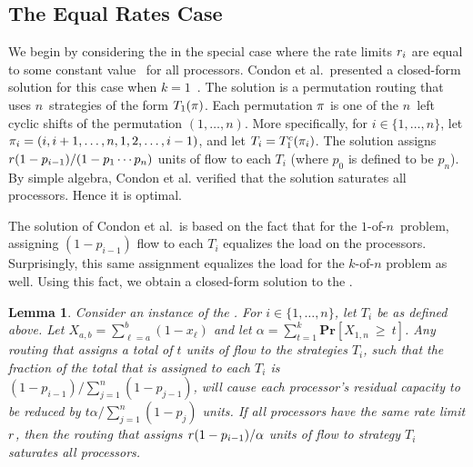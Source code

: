 \documentclass{article}
\newcounter{thmcount}
\newcounter{ass}
\newtheorem{lem}[thmcount]{Lemma}
\newcommand{\ens}[1]{\ensuremath{#1}}					\newcommand{\card}[1]{\ens{|#1|}}							\newcommand{\dotlist}[2]{\ens{#1,\ldots,#2}}
\newcommand{\anitem}{\ens{x}}
\newcommand{\valn}{\ens{n}}
\newcommand{\valk}{\ens{k}}
\newcommand{\kofn}{\valk-of-\valn}
\newcommand{\oneofn}{$1$-of-\valn}
\newcommand{\processor}{processor}
\newcommand{\retval}[1]{\ens{\anitem_{#1}}}					\newcommand{\pr}[1]{\ens{p_{#1}}}									\newcommand{\qr}[1]{\ens{q_{#1}}}									\newcommand{\op}[1]{\ens{O_{#1}}}									\newcommand{\megaop}[1]{\ens{E_{#1}}}
\newcommand{\probgen}[1]{\ens{\mathbf{Pr}\left[#1\right]}}
\newcommand{\hitsum}[2]{\ens{X_{#1,#2}}}					\newcommand{\probeq}[3]{\probgen{\hitsum{#1}{#2}~=~#3}}
\newcommand{\probge}[3]{\probgen{\hitsum{#1}{#2}~\geq~#3}}
\begin{document}
\subsection{The Equal Rates Case}

We begin by considering the \cmt{} in the special case where the rate limits $\rate i$ are equal to some constant
value \commonr\ for all {\processor}s.
Condon et al.~presented a closed-form solution for this case 
when $\valk = 1$~\cite{journals/talg/CondonDHW09}.  
The solution is a permutation routing that uses \valn\ strategies of the form $T_1(\perm)$.
Each permutation $\perm$ is one of the \valn\ 
left cyclic shifts of the permutation $(1, \ldots, n)$.
More specifically,
for $i \in \{1, \ldots, n\}$, let $\perm_i  = (i, i+1, \ldots, n, 1, 2, \ldots, i-1)$,
and let $T_i = \cstrat{1}{\perm_i}$.
The solution assigns $\commonr(1-\pr{i-1})/(1-\pr 1 \cdots \pr{\valn})$ units of flow to each $T_i$ (where $\pr{0}$ is defined to be $\pr{\valn}$).
By simple algebra,
Condon et al.
verified that the solution saturates all {\processor}s.
Hence it is optimal.

The solution of Condon et al.~is based on the fact that for the
\oneofn\ problem, assigning $(1-\pr{i-1})$ flow
to each $T_i$ equalizes the load on the {\processor}s.
Surprisingly, this same assignment equalizes the load for the \kofn{} problem as well.
Using this fact, we obtain a closed-form solution to the
\cmt.

\begin{lem}
\label{lem:equalrates}
Consider an instance of the {\cmt}. 
For $i \in \{1, \ldots, n\}$, let $T_i$ be as defined above.
Let $\hitsum ab = \sum_{\ell=a}^b (1-\retval \ell)$
and let $\alpha = \sum_{t=1}^k \probge 1\valn t$. 
Any routing that assigns a total of $t$
units of flow to
the strategies $T_i$, such that the fraction of the total that is assigned to each $T_i$ is
$(1 - \pr{i-1})/\sum_{j=1}^n (1 - \pr{j-1})$,
will cause each processor's residual capacity to be reduced by
$t \alpha/\sum_{j=1}^n (1 - \pr{j})$ units.
If all processors have the same rate limit $\commonr$, 
then the routing that assigns
$\commonr(1-\pr{i-1})/\alpha$ units of flow to strategy $T_i$
saturates all {\processor}s.
\end{lem}
\end{document}
